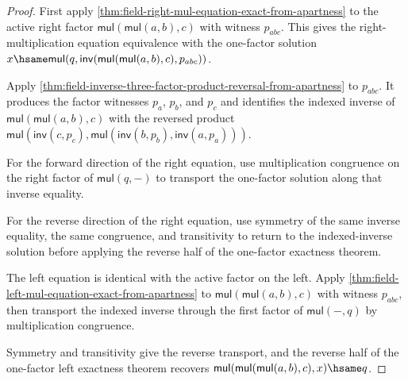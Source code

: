 \begin{proof}
First apply
\autoref{thm:field-right-mul-equation-exact-from-apartness} to the active
right factor $\mathsf{mul}(\mathsf{mul}(a,b),c)$ with witness $p_{abc}$. This
gives the right-multiplication equation equivalence with the one-factor
solution
$x\hsame\mathsf{mul}(q,
\mathsf{inv}(\mathsf{mul}(\mathsf{mul}(a,b),c),p_{abc}))$.

Apply
\autoref{thm:field-inverse-three-factor-product-reversal-from-apartness} to
$p_{abc}$. It produces the factor witnesses $p_a$, $p_b$, and $p_c$ and
identifies the indexed inverse of
$\mathsf{mul}(\mathsf{mul}(a,b),c)$ with the reversed product
$\mathsf{mul}(\mathsf{inv}(c,p_c),
\mathsf{mul}(\mathsf{inv}(b,p_b),\mathsf{inv}(a,p_a)))$.

For the forward direction of the right equation, use multiplication
congruence on the right factor of $\mathsf{mul}(q,-)$ to transport the
one-factor solution along that inverse equality.

For the reverse direction of the right equation, use symmetry of the same
inverse equality, the same congruence, and
transitivity to return to the indexed-inverse solution before applying the
reverse half of the one-factor exactness theorem.

The left equation is identical with the active factor on the left. Apply
\autoref{thm:field-left-mul-equation-exact-from-apartness} to
$\mathsf{mul}(\mathsf{mul}(a,b),c)$ with witness $p_{abc}$, then transport
the indexed inverse through the first factor of $\mathsf{mul}(-,q)$ by
multiplication congruence.

Symmetry and transitivity give the reverse transport, and the reverse half of
the one-factor left exactness theorem recovers
$\mathsf{mul}(\mathsf{mul}(\mathsf{mul}(a,b),c),x)\hsame q$.
\end{proof}

